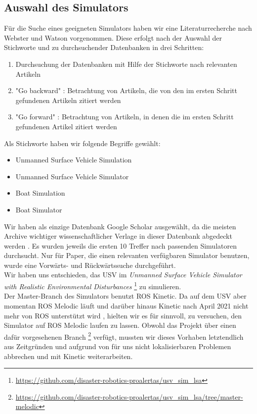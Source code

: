 \documentclass[conference]{IEEEtran}
\begin{document}
\subsection{Auswahl des Simulators}
Für die Suche eines geeigneten Simulators haben wir eine Literaturrecherche nach Webster und Watson \cite{b9} vorgenommen. Diese erfolgt nach der Auswahl der Stichworte und zu durchsuchender Datenbanken in drei Schritten:
\begin{enumerate}
	\item Durchsuchung der Datenbanken mit Hilfe der Stichworte nach relevanten Artikeln
	\item "Go backward" \cite{b9}: Betrachtung von Artikeln, die von den im ersten Schritt gefundenen Artikeln zitiert werden
	\item "Go forward" \cite{b9}: Betrachtung von Artikeln, in denen die im ersten Schritt gefundenen Artikel zitiert werden
\end{enumerate}
Als Stichworte haben wir folgende Begriffe gewählt:
\begin{itemize}
	\item Unmanned Surface Vehicle Simulation
	\item Unmanned Surface Vehicle Simulator
	\item Boat Simulation
	\item Boat Simulator
\end{itemize}
Wir haben als einzige Datenbank Google Scholar ausgewählt, da die meisten Archive wichtiger wissenschaftlicher Verlage in dieser Datenbank abgedeckt werden \cite{b8}. Es wurden jeweils die ersten 10 Treffer nach passenden Simulatoren durchsucht. Nur für Paper, die einen relevanten verfügbaren Simulator benutzen, wurde eine Vorwärts- und Rückwärtssuche durchgeführt.\\

Wir haben uns entschieden, das USV im \textit{Unmanned Surface Vehicle Simulator with Realistic Environmental Disturbances} \footnote{\url{https://github.com/disaster-robotics-proalertas/usv_sim_lsa}} zu simulieren.\\
Der Master-Branch des Simulators benutzt ROS Kinetic. Da auf dem USV aber momentan ROS Melodic läuft und darüber hinaus Kinetic nach April 2021 nicht mehr von ROS unterstützt wird \cite{b10}, hielten wir es für sinnvoll, zu versuchen, den Simulator auf ROS Melodic laufen zu lassen. Obwohl das Projekt über einen dafür vorgesehenen Branch \footnote{\url{https://github.com/disaster-robotics-proalertas/usv_sim_lsa/tree/master-melodic}} verfügt, mussten wir dieses Vorhaben letztendlich aus Zeitgründen und aufgrund von für uns nicht lokalisierbaren Problemen abbrechen und mit Kinetic weiterarbeiten.
\end{document}
